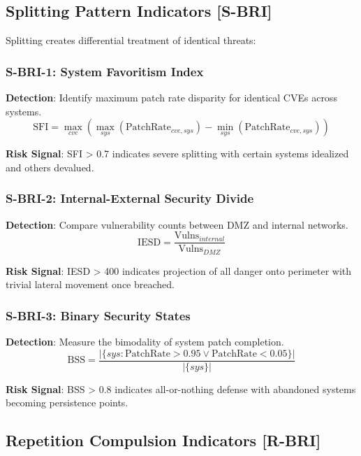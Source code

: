 \documentclass[11pt,a4paper]{article}
\begin{document}
\subsection{Splitting Pattern Indicators [S-BRI]}

Splitting creates differential treatment of identical threats:

\subsubsection{S-BRI-1: System Favoritism Index}
\textbf{Detection}: Identify maximum patch rate disparity for identical CVEs across systems.
\begin{equation}
\text{SFI} = \max_{cve} \left(\max_{sys}(\text{PatchRate}_{cve,sys}) - \min_{sys}(\text{PatchRate}_{cve,sys})\right)
\end{equation}

\textbf{Risk Signal}: SFI > 0.7 indicates severe splitting with certain systems idealized and others devalued.

\subsubsection{S-BRI-2: Internal-External Security Divide}
\textbf{Detection}: Compare vulnerability counts between DMZ and internal networks.
\begin{equation}
\text{IESD} = \frac{\text{Vulns}_{internal}}{\text{Vulns}_{DMZ}}
\end{equation}

\textbf{Risk Signal}: IESD > 400 indicates projection of all danger onto perimeter with trivial lateral movement once breached.

\subsubsection{S-BRI-3: Binary Security States}
\textbf{Detection}: Measure the bimodality of system patch completion.
\begin{equation}
\text{BSS} = \frac{|\{sys : \text{PatchRate} > 0.95 \lor \text{PatchRate} < 0.05\}|}{|\{sys\}|}
\end{equation}

\textbf{Risk Signal}: BSS > 0.8 indicates all-or-nothing defense with abandoned systems becoming persistence points.

\subsection{Repetition Compulsion Indicators [R-BRI]}
\end{document}
